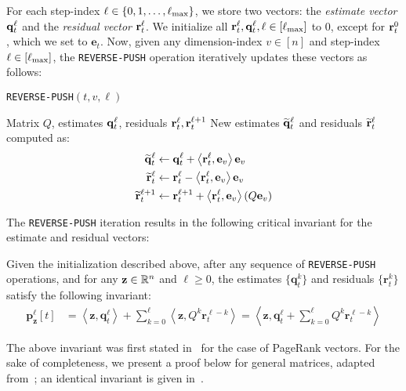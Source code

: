 For each step-index $\ell\in\{0,1,\ldots,\ell_{\max}\}$, we store two vectors: the \emph{estimate vector} $\mathbf{q}^{\ell}_t$ and the \emph{residual vector} $\mathbf{r}^{\ell}_t$.
We initialize all $\mathbf{r}^{\ell}_t,\mathbf{q}^{\ell}_t, \ell\in[\ell_{\max}]$ to $0$, except for $\mathbf{r}^{0}_t$, which we set to $\mathbf{e}_t$.
Now, given any dimension-index $v\in[n]$ and step-index $\ell\in[\ell_{\max}]$, the \texttt{REVERSE-PUSH} operation iteratively updates these vectors as follows:
\begin{algorithm}[!ht]
\caption{\texttt{REVERSE-PUSH}$(t,v,\ell)$}
\label{alg:push}
\begin{algorithmic}[1]
\REQUIRE Matrix $Q$, estimates $\mathbf{q}^{\ell}_t$, residuals $\mathbf{r}^{\ell}_t,\mathbf{r}^{\ell+1}_t$
\RETURN New estimates $\widetilde{\mathbf{q}}^{\ell}_t$ and residuals $\widetilde{\mathbf{r}}^{\ell}_t$ computed as:
\begin{align*}
	\widetilde{\mathbf{q}}^{\ell}_t &\leftarrow \mathbf{q}^{\ell}_t + \left< \mathbf{r}^{\ell}_t, \mathbf{e}_v \right>\mathbf{e}_v \\
	\widetilde{\mathbf{r}}^{\ell}_t &\leftarrow \mathbf{r}^{\ell}_t - \left< \mathbf{r}^{\ell}_t, \mathbf{e}_v \right>\mathbf{e}_v \\
	\widetilde{\mathbf{r}}^{\ell+1}_t &\leftarrow \mathbf{r}^{\ell+1}_t + \left< \mathbf{r}^{\ell}_t, \mathbf{e}_v \right>(Q\mathbf{e}_v)
\end{align*}	
\end{algorithmic}
\end{algorithm}    

The \texttt{REVERSE-PUSH} iteration results in the following critical invariant for the estimate and residual vectors:
\begin{lemma}
\label{lem:pushinvariant}
Given the initialization described above, after any sequence of \texttt{REVERSE-PUSH} operations, and for any $\mathbf{z}\in\mathbb{R}^n$ and $\ell\geq 0$, the estimates $\{\mathbf{q}_t^k\}$ and residuals $\{\mathbf{r}_t^k\}$  satisfy the following invariant:
\begin{align*}
\mathbf{p}_\mathbf{z}^{\ell}[t] &= \left< \mathbf{z}, \mathbf{q}_t^{\ell} \right> + \sum_{k=0}^{\ell} \left<\mathbf{z}, Q^k\mathbf{r}_t^{\ell-k}\right> = \left< \mathbf{z}, \mathbf{q}_t^{\ell}  + \sum_{k=0}^{\ell} Q^k\mathbf{r}_t^{\ell-k}\right>
\end{align*}
\end{lemma}

The above invariant was first stated in~\cite{andersen2007local} for the case of PageRank vectors. 
For the sake of completeness, we present a proof below for general matrices, adapted from~\cite{Lofgren2014}; an identical invariant is given in~\cite{lee2014asynchronous}.

